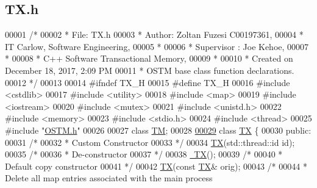 \hypertarget{_t_x_8h_source}{}\subsection{T\+X.\+h}

\begin{DoxyCode}
00001 \textcolor{comment}{/* }
00002 \textcolor{comment}{ * File:   TX.h}
00003 \textcolor{comment}{ * Author: Zoltan Fuzesi C00197361, }
00004 \textcolor{comment}{ * IT Carlow, Software Engineering, }
00005 \textcolor{comment}{ *}
00006 \textcolor{comment}{ * Supervisor : Joe Kehoe, }
00007 \textcolor{comment}{ *}
00008 \textcolor{comment}{ * C++ Software Transactional Memory, }
00009 \textcolor{comment}{ * }
00010 \textcolor{comment}{ * Created on December 18, 2017, 2:09 PM}
00011 \textcolor{comment}{ * OSTM base class function declarations.}
00012 \textcolor{comment}{ */}
00013 
00014 \textcolor{preprocessor}{#ifndef TX\_H}
00015 \textcolor{preprocessor}{#define TX\_H}
00016 \textcolor{preprocessor}{#include <cstdlib>}
00017 \textcolor{preprocessor}{#include <utility>}
00018 \textcolor{preprocessor}{#include <map>}
00019 \textcolor{preprocessor}{#include <iostream>}
00020 \textcolor{preprocessor}{#include <mutex>}
00021 \textcolor{preprocessor}{#include <unistd.h>}
00022 \textcolor{preprocessor}{#include <memory>}
00023 \textcolor{preprocessor}{#include <stdio.h>}
00024 \textcolor{preprocessor}{#include <thread>}
00025 \textcolor{preprocessor}{#include "\hyperlink{_o_s_t_m_8h}{OSTM.h}"}
00026 
00027 \textcolor{keyword}{class }\hyperlink{class_t_m}{TM};
00028 
\hypertarget{_t_x_8h_source.tex_l00029}{}\hyperlink{class_t_x}{00029} \textcolor{keyword}{class }\hyperlink{class_t_x}{TX} \{
00030 \textcolor{keyword}{public}:
00031     \textcolor{comment}{/*}
00032 \textcolor{comment}{     * Custom Constructor}
00033 \textcolor{comment}{     */}
00034     \hyperlink{class_t_x_a8a4b83eab0171ae834bfa92bbced1094_a8a4b83eab0171ae834bfa92bbced1094}{TX}(std::thread::id \textcolor{keywordtype}{id});
00035     \textcolor{comment}{/*}
00036 \textcolor{comment}{     * De-constructor}
00037 \textcolor{comment}{     */}
00038     \hyperlink{class_t_x_abecf854cc3228ab6dd51175b3cd1c70a_abecf854cc3228ab6dd51175b3cd1c70a}{~TX}();
00039     \textcolor{comment}{/*}
00040 \textcolor{comment}{     * Default copy constructor}
00041 \textcolor{comment}{     */}
00042     \hyperlink{class_t_x_a8a4b83eab0171ae834bfa92bbced1094_a8a4b83eab0171ae834bfa92bbced1094}{TX}(\textcolor{keyword}{const} \hyperlink{class_t_x}{TX}& orig);
00043     \textcolor{comment}{/*}
00044 \textcolor{comment}{     * Delete all map entries associated with the main process}

\end{DoxyCode}
